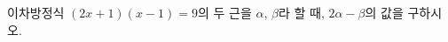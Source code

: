 이차방정식 $(2x+1)(x-1)=9$의 두 근을 $\alpha$, $\beta$라 할 때, $2\alpha-\beta$의 값을 구하시오. \cond{$\alpha>\beta$}
